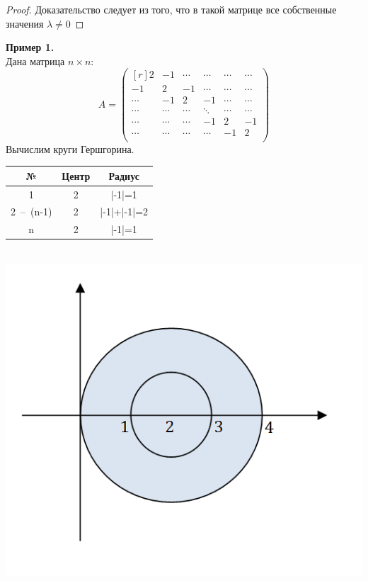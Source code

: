 \begin{proof}
    Доказательство следует из того, что в такой матрице все собственные значения $\lambda\neq 0$
\end{proof}
\textbf{Пример 1.}\\
Дана матрица $n\times n$:
\[A=\begin{pmatrix}[r]
2 & -1 & \cdots & \cdots & \cdots & \cdots\\
-1 & 2 & -1 & \cdots & \cdots & \cdots\\
\cdots & -1 & 2 & -1 & \cdots & \cdots\\
\cdots & \cdots & \cdots & \ddots & \cdots & \cdots\\
\cdots & \cdots & \cdots & -1 & 2 & -1\\
\cdots & \cdots & \cdots & \cdots & -1 & 2\\
\end{pmatrix}\]
Вычислим круги Гершгорина.
\begin{center}
    \begin{tabular}{|c|c|c|}
        \hline
        № & Центр & Радиус \\ \hline
        1 & 2 & |-1|=1 \\ \hline
        2~--~(n-1) & 2 & |-1|+|-1|=2 \\ \hline
        n & 2 & |-1|=1 \\ \hline
    \end{tabular}\\
    \includegraphics[scale=0.8]{l9_3.png}
\end{center}
